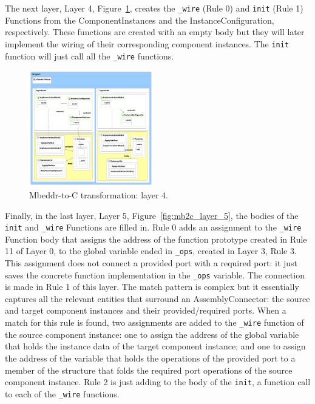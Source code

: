 The next layer, Layer 4, Figure~\ref{fig:mb2c_layer_4}, creates the \verb=_wire=
(Rule 0) and \verb=init= (Rule 1) Functions from the ComponentInstances and the
InstanceConfiguration, respectively. These functions are created with an empty
body but they will later implement the wiring of their
corresponding component instances. The \verb=init= function will just call all
the \verb=_wire= functions.

\begin{figure}
\begin{center}
  \includegraphics[width=0.48\textwidth]{figures/mbeddr2C_optimized_layer_4}
  \caption{Mbeddr-to-C transformation: layer 4.}
  \label{fig:mb2c_layer_4}
\end{center}
\end{figure}

Finally, in the last layer, Layer 5, Figure~\ref{fig:mb2c_layer_5}, the bodies
of the \verb=init= and \verb=_wire= Functions are filled in.
Rule 0 adds an assignment to the \verb=_wire= Function body that assigns the
address of the function prototype created in Rule 11 of Layer 0, to the global
variable ended in \verb=_ops=, created in Layer 3, Rule 3.
This assignment does not connect a provided port with a required port:
it just saves the concrete function implementation in the \verb=_ops= variable.
The connection is made in Rule 1 of this layer. The match pattern is complex but
it essentially captures all the relevant entities that surround an
AssemblyConnector: the source and target component instances and their
provided/required ports. When a match for this rule is found, two assignments
are added to the \verb=_wire= function of the source component instance:
one to assign the address of the global variable that holds the instance data of
the target component instance; and one to assign the address of the variable
that holds the operations of the provided port to a member of the structure that
folds the required port operations of the source component instance.
Rule 2 is just adding to the body of the \verb=init=, a function call to each of
the \verb=_wire= functions.

